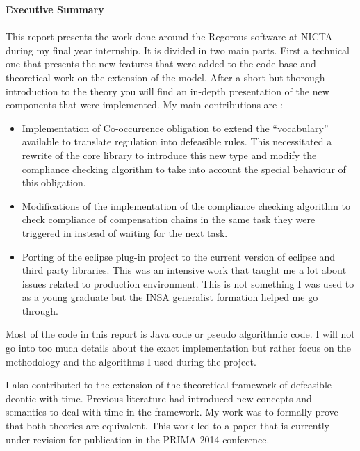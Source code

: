 \documentclass[10pt]{report}
\begin{document}
\newpage
\thispagestyle{empty}
\mbox{}

\restoregeometry
{}

\renewcommand{\thesection}{\Roman{section}} 
\renewcommand{\abstractname}{Executive Summary}
\begin{center}
\begin{minipage}{\textwidth}
\textbf{\large Executive Summary}\\\\ This report presents the work done around the Regorous software at NICTA during my final year internship. It is divided in two main parts. First a technical one that presents the new features that were added to the code-base and theoretical work on the extension of the model. After a short but thorough introduction to the theory you will find an in-depth presentation of the new components that were implemented. My main contributions are : 
\begin{itemize}
\item Implementation of Co-occurrence obligation to extend the \enquote{vocabulary} available to translate regulation into defeasible rules. This necessitated a rewrite of the core library to introduce this new type and modify the compliance checking algorithm to take into account the special behaviour of this obligation.
\item Modifications of the implementation of the compliance checking algorithm to check compliance of compensation chains in the same task they were triggered in instead of waiting for the next task. 
\item Porting of the eclipse plug-in project to the current version of eclipse and third party libraries. This was an intensive work that taught me a lot about issues related to production environment. This is not something I was used to as a young graduate but the INSA generalist formation helped me go through.
\end{itemize}

Most of the code in this report is Java code or pseudo algorithmic code. I will not go into too much details about the exact implementation but rather focus on the methodology and the algorithms I used during the project.

I also contributed to the extension of the theoretical framework of defeasible deontic with time. Previous literature had introduced new concepts and semantics to deal with time in the framework. My work was to formally prove that both theories are equivalent. This work led to a paper that is currently under revision for publication in the PRIMA 2014 conference.


\end{minipage}
\end{center}
\end{document}
